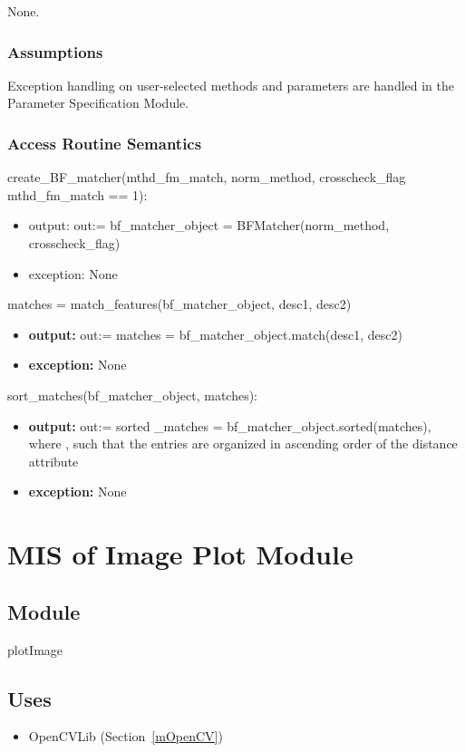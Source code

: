\documentclass[12pt, titlepage]{article}
\begin{document}
None.

\subsubsection{Assumptions}

Exception handling on user-selected methods and parameters are handled in the Parameter 
Specification Module.

\subsubsection{Access Routine Semantics}

create\_BF\_matcher(mthd\_fm\_match, norm\_method, crosscheck\_flag 
\textbar \: mthd\_fm\_match == 1):
\begin{itemize}
  \item output: out:= bf\_matcher\_object = BFMatcher(norm\_method, 
  crosscheck\_flag) 
  \item exception: None
\end{itemize} 
matches = match\_features(bf\_matcher\_object, desc1, desc2) 
\begin{itemize}
  \item \textbf{output:} out:= matches = bf\_matcher\_object.match(desc1, desc2)
  \item \textbf{exception:} None
\end{itemize}
sort\_matches(bf\_matcher\_object, matches):\newline
\begin{itemize}
  \item \textbf{output:} out:= sorted \_matches = bf\_matcher\_object.sorted(matches), where , such that the entries
  are organized in ascending order of the distance attribute
  \item \textbf{exception:} None
\end{itemize}



\section{MIS of Image Plot Module} \label{mIP}
\subsection{Module}
plotImage

\subsection{Uses}
\begin{itemize}
  \item OpenCVLib (Section~\ref{mOpenCV})
\end{itemize}
\end{document}
